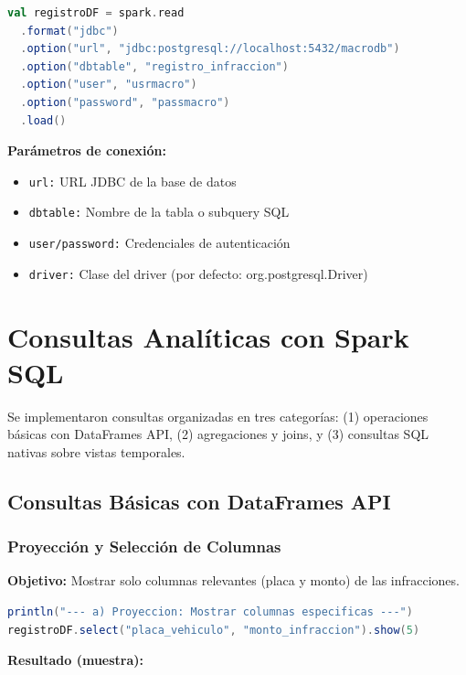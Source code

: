 \documentclass[12pt,a4paper]{article}
\begin{document}
\begin{lstlisting}[language=Scala, caption={Conexión Spark SQL - PostgreSQL}]
val registroDF = spark.read
  .format("jdbc")
  .option("url", "jdbc:postgresql://localhost:5432/macrodb")
  .option("dbtable", "registro_infraccion")
  .option("user", "usrmacro")
  .option("password", "passmacro")
  .load()
\end{lstlisting}

\textbf{Parámetros de conexión:}
\begin{itemize}
    \item \texttt{url:} URL JDBC de la base de datos
    \item \texttt{dbtable:} Nombre de la tabla o subquery SQL
    \item \texttt{user/password:} Credenciales de autenticación
    \item \texttt{driver:} Clase del driver (por defecto: org.postgresql.Driver)
\end{itemize}

\section{Consultas Analíticas con Spark SQL}

Se implementaron consultas organizadas en tres categorías: (1) operaciones básicas con DataFrames API, (2) agregaciones y joins, y (3) consultas SQL nativas sobre vistas temporales.

\subsection{Consultas Básicas con DataFrames API}

\subsubsection{Proyección y Selección de Columnas}

\textbf{Objetivo:} Mostrar solo columnas relevantes (placa y monto) de las infracciones.

\begin{lstlisting}[language=Scala, caption={Proyección de columnas específicas}]
println("--- a) Proyeccion: Mostrar columnas especificas ---")
registroDF.select("placa_vehiculo", "monto_infraccion").show(5)
\end{lstlisting}

\textbf{Resultado (muestra):}
\end{document}
